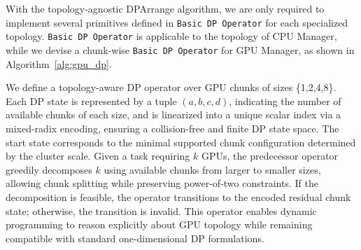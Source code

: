 With the topology-agnostic DPArrange algorithm, we are only required to implement several primitives defined in \texttt{Basic DP Operator} for each specialized topology. \texttt{Basic DP Operator} is applicable to the topology of CPU Manager, while we devise a chunk-wise \texttt{Basic DP Operator} for GPU Manager, as shown in Algorithm~\ref{alg:gpu_dp}.

We define a topology-aware DP operator over GPU chunks of sizes \{1,2,4,8\}.
Each DP state is represented by a tuple $(a, b,c,d)$, indicating the number of available chunks of each size, and is linearized into a unique scalar index via a mixed-radix encoding, ensuring a collision-free and finite DP state space.
The start state corresponds to the minimal supported chunk configuration determined by the cluster scale.
Given a task requiring $k$ GPUs, the predecessor operator greedily decomposes $k$ using available chunks from larger to smaller sizes, allowing chunk splitting while preserving power-of-two constraints.
If the decomposition is feasible, the operator transitions to the encoded residual chunk state; otherwise, the transition is invalid.
This operator enables dynamic programming to reason explicitly about GPU topology while remaining compatible with standard one-dimensional DP formulations.


